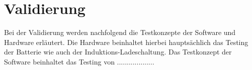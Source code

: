 \section{Validierung} \label{sec:validierung}

Bei der Validierung werden nachfolgend die Testkonzepte der Software und Hardware erläutert. Die Hardware beinhaltet hierbei hauptsächlich das Testing der Batterie wie auch der Induktions-Ladeschaltung. Das Testkonzept der Software beinhaltet das Testing von ...................